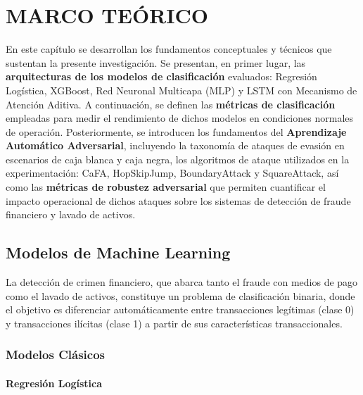 \chapter{MARCO TEÓRICO}

En este capítulo se desarrollan los fundamentos conceptuales y técnicos que sustentan la presente investigación. Se presentan, en primer lugar, las \textbf{arquitecturas de los modelos de clasificación} evaluados: Regresión Logística, XGBoost, Red Neuronal Multicapa (MLP) y LSTM con Mecanismo de Atención Aditiva. A continuación, se definen las \textbf{métricas de clasificación} empleadas para medir el rendimiento de dichos modelos en condiciones normales de operación. Posteriormente, se introducen los fundamentos del \textbf{Aprendizaje Automático Adversarial}, incluyendo la taxonomía de ataques de evasión en escenarios de caja blanca y caja negra, los algoritmos de ataque utilizados en la experimentación: CaFA, HopSkipJump, BoundaryAttack y SquareAttack, así como las \textbf{métricas de robustez adversarial} que permiten cuantificar el impacto operacional de dichos ataques sobre los sistemas de detección de fraude financiero y lavado de activos.

\section{Modelos de Machine Learning}

La detección de crimen financiero, que abarca tanto el fraude con medios de pago como el lavado de activos, constituye un problema de clasificación binaria, donde el objetivo es diferenciar automáticamente entre transacciones legítimas (clase 0) y transacciones ilícitas (clase 1) a partir de sus características transaccionales.

\subsection{Modelos Clásicos}

\subsubsection{Regresión Logística}

